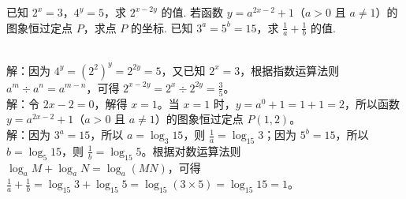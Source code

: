 \documentclass{ctexart}
\newenvironment{MyAnswer}[1][] %
{
    \begin{tcolorbox}[breakable, colframe=blue]
    \begin{Answer}[#1] \color{blue} \kaishu
        }  %
{\end{Answer}
\end{tcolorbox}
}
\begin{document}

 \clearpage
\begin{Exercise}[title={指数运算小练习}, label={ex:exponent}]
    \Question 已知 $2^x = 3$，$4^y = 5$，求 $2^{x - 2y}$ 的值.
    \Question 若函数 $y = a^{2x - 2}+1$（$a>0$ 且 $a\neq1$）的图象恒过定点 $P$，求点 $P$ 的坐标.
    \Question 已知 $3^a = 5^b = 15$，求 $\frac{1}{a}+\frac{1}{b}$ 的值.
\end{Exercise}

\begin{MyAnswer}[ref={ex:exponent}]
    \Question {}\\ 解：因为 $4^y=(2^2)^y = 2^{2y}=5$，又已知 $2^x = 3$，根据指数运算法则 $a^m\div a^n=a^{m - n}$，可得 $2^{x - 2y}=2^x\div2^{2y}=\frac{3}{5}$。
    \Question {}\\ 解：令 $2x - 2 = 0$，解得 $x = 1$。当 $x = 1$ 时，$y=a^{0}+1=1 + 1=2$，所以函数 $y = a^{2x - 2}+1$（$a>0$ 且 $a\neq1$）的图象恒过定点 $P(1,2)$。
    \Question {}\\ 解：因为 $3^a = 15$，所以 $a=\log_3{15}$，则 $\frac{1}{a}=\log_{15}3$；因为 $5^b = 15$，所以 $b=\log_5{15}$，则 $\frac{1}{b}=\log_{15}5$。根据对数运算法则 $\log_aM+\log_aN=\log_a(MN)$，可得 $\frac{1}{a}+\frac{1}{b}=\log_{15}3+\log_{15}5=\log_{15}(3\times5)=\log_{15}15 = 1$。
\end{MyAnswer}
\clearpage
\end{document}

